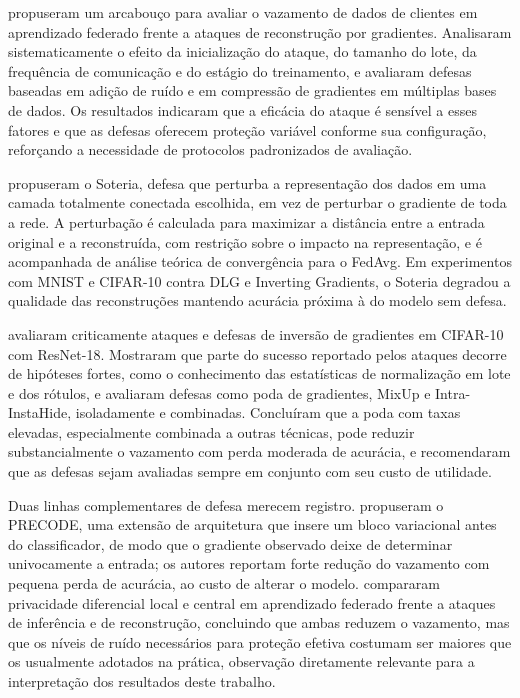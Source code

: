  propuseram um arcabouço para avaliar o vazamento de dados de clientes em aprendizado federado frente a ataques de reconstrução por gradientes. Analisaram sistematicamente o efeito da inicialização do ataque, do tamanho do lote, da frequência de comunicação e do estágio do treinamento, e avaliaram defesas baseadas em adição de ruído e em compressão de gradientes em múltiplas bases de dados. Os resultados indicaram que a eficácia do ataque é sensível a esses fatores e que as defesas oferecem proteção variável conforme sua configuração, reforçando a necessidade de protocolos padronizados de avaliação.

 propuseram o Soteria, defesa que perturba a representação dos dados em uma camada totalmente conectada escolhida, em vez de perturbar o gradiente de toda a rede. A perturbação é calculada para maximizar a distância entre a entrada original e a reconstruída, com restrição sobre o impacto na representação, e é acompanhada de análise teórica de convergência para o FedAvg. Em experimentos com MNIST e CIFAR-10 contra DLG e Inverting Gradients, o Soteria degradou a qualidade das reconstruções mantendo acurácia próxima à do modelo sem defesa.

 avaliaram criticamente ataques e defesas de inversão de gradientes em CIFAR-10 com ResNet-18. Mostraram que parte do sucesso reportado pelos ataques decorre de hipóteses fortes, como o conhecimento das estatísticas de normalização em lote e dos rótulos, e avaliaram defesas como poda de gradientes, MixUp e Intra-InstaHide, isoladamente e combinadas. Concluíram que a poda com taxas elevadas, especialmente combinada a outras técnicas, pode reduzir substancialmente o vazamento com perda moderada de acurácia, e recomendaram que as defesas sejam avaliadas sempre em conjunto com seu custo de utilidade.

Duas linhas complementares de defesa merecem registro.  propuseram o PRECODE, uma extensão de arquitetura que insere um bloco variacional antes do classificador, de modo que o gradiente observado deixe de determinar univocamente a entrada; os autores reportam forte redução do vazamento com pequena perda de acurácia, ao custo de alterar o modelo.  compararam privacidade diferencial local e central em aprendizado federado frente a ataques de inferência e de reconstrução, concluindo que ambas reduzem o vazamento, mas que os níveis de ruído necessários para proteção efetiva costumam ser maiores que os usualmente adotados na prática, observação diretamente relevante para a interpretação dos resultados deste trabalho.

